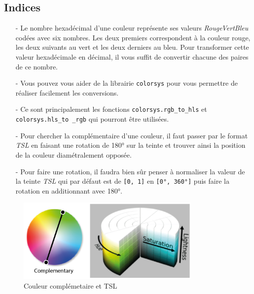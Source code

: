 \subsection*{Indices}
\begin{itemize}
	\item[-] Le nombre hexadécimal d'une couleur représente ses valeurs \textit{RougeVertBleu} codées avec six nombres. Les deux premiers correspondent à la couleur rouge, les deux suivants au vert et les deux derniers au bleu. Pour transformer cette valeur hexadécimale en décimal, il vous suffit de convertir chacune des paires de ce nombre.
	\item[-] Vous pouvez vous aider de la librairie \texttt{colorsys} pour vous permettre de réaliser facilement les conversions.
	\item[-] Ce sont principalement les fonctions \texttt{colorsys.rgb\_to\_hls} et \texttt{colorsys.hls\_to \_rgb} qui pourront être utilisées. 
	\item[-] Pour chercher la complémentaire d’une couleur, il faut passer par le format \textit{TSL} en faisant une rotation de 180° sur la teinte et trouver ainsi la position de la couleur diamétralement opposée.
	\item[-] Pour faire une rotation, il faudra bien sûr penser à normaliser la valeur de la teinte \textit{TSL} qui par défaut est de \texttt{[0, 1]} en \texttt{[0°, 360°]} puis faire la rotation en additionnant avec 180°.
\end{itemize}
\medskip

\begin{figure}[h]
    \centering
    \includegraphics[width=0.8\textwidth]{IMG/schema_colors.png}
    \caption{Couleur complémetaire et TSL}
    \label{fig:colorpicker}
\end{figure}
\medskip

